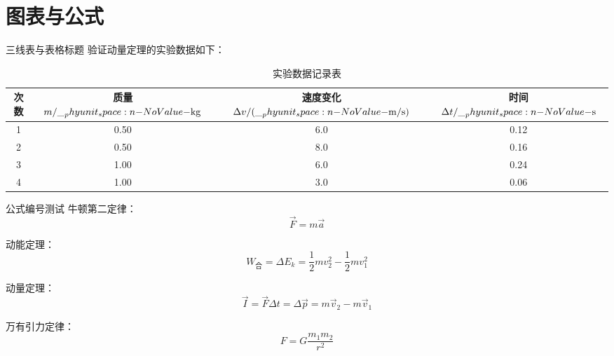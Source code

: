 \documentclass[darkmode=false, randomquote=true, quoteseed=2026, shownav=false,handout=false]{HiBeamer}
\begin{document}
\section{图表与公式}

\begin{frame}{三线表与表格标题}
  验证动量定理的实验数据如下：

  \vspace{0.3cm}
  \begin{table}
    \centering
    \begin{tabular}{cccc}
      \toprule
      次数 & 质量 $m/\Ukg$ & 速度变化 $\Delta v/(\Ums)$ & 时间 $\Delta t/\Us$ \\
      \midrule
      1 & 0.50 & 6.0 & 0.12 \\
      2 & 0.50 & 8.0 & 0.16 \\
      3 & 1.00 & 6.0 & 0.24 \\
      4 & 1.00 & 3.0 & 0.06 \\
      \bottomrule
    \end{tabular}
    \caption{实验数据记录表}
  \end{table}
\end{frame}

\begin{frame}{公式编号测试}
  牛顿第二定律：
  \begin{equation}
    \vec{F} = m \vec{a}
  \end{equation}

  动能定理：
  \begin{equation}
    W_{\text{合}} = \Delta E_k = \frac{1}{2}mv_2^2 - \frac{1}{2}mv_1^2
  \end{equation}

  动量定理：
  \begin{equation}
    \vec{I} = \vec{F}\Delta t = \Delta \vec{p} = m\vec{v}_2 - m\vec{v}_1
  \end{equation}

  万有引力定律：
  \begin{equation}
    F = G\frac{m_1 m_2}{r^2}
  \end{equation}
\end{frame}
\end{document}
